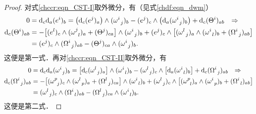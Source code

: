 \begin{proof}
    对式\eqref{chccr:eqn_CST-I}取外微分，有（见式\eqref{chdf:eqn_dwm}）
    \begin{align*}
        0 & = {\rm d}_c {\rm d}_a (e^i)_b =
        \bigl({\rm d}_c (e^j)_a\bigr) \wedge (\omega _{\hphantom{a} j}^i)_b
        -  (e^j)_c  \wedge \bigl({\rm d}_a(\omega _{\hphantom{a} j}^i)_b\bigr)
        +{\rm d}_c (\Theta ^{i})_{ab} \quad  { \Rightarrow} \\
        {\rm d}_c (\Theta ^{i})_{ab} &=  -
        \bigl [(e^l)_c \wedge (\omega _{\hphantom{a} l}^j)_a +(\Theta ^{j})_{ca} \bigr]
        \wedge (\omega _{\hphantom{a} j}^i)_b +  (e^j)_c  \wedge
        \bigl[ ( \omega _{\hphantom{a} j}^l )_a \wedge
        ( \omega _{\hphantom{a} l}^i )_b + (\Omega_{\hphantom{a} j} ^{i})_{ab} \bigr] \\
        &= (e^j)_c \wedge(\Omega_{\hphantom{a} j} ^{i})_{ab}
        -(\Theta ^{j})_{ca} \wedge (\omega _{\hphantom{a} j}^i)_b .
    \end{align*} 
    这便是第一式．再对\eqref{chccr:eqn_CST-II}取外微分，有
    \begin{align*}
        0 & = {\rm d}_c{\rm d}_a ( \omega _{\hphantom{a} j} ^i  )_b =
        \bigl[{\rm d}_c ( \omega _{\hphantom{a} j}^l )_a \bigr]
        \wedge ( \omega _{\hphantom{a} l}^i )_b
        -( \omega _{\hphantom{a} j}^l )_c   \wedge
        \bigl[ {\rm d}_a ( \omega _{\hphantom{a} l}^i )_b \bigr]
        + {\rm d}_c (\Omega_{\hphantom{a} j} ^{i})_{ab} \quad  { \Rightarrow} \\
        {\rm d}_c (\Omega_{\hphantom{a} j} ^{i})_{ab} &=
        -\bigl[( \omega _{\hphantom{a} j}^p )_c
        \wedge ( \omega _{\hphantom{a} p}^l )_a + (\Omega_{\hphantom{a} j} ^{l})_{ca} \bigr]
        \wedge ( \omega _{\hphantom{a} l}^i )_b +
        ( \omega _{\hphantom{a} j}^l )_c   \wedge
        \bigl[ ( \omega _{\hphantom{a} l}^p )_a
        \wedge ( \omega _{\hphantom{a} p}^i )_b + (\Omega_{\hphantom{a} l} ^{i})_{ab} \bigr] \\
        & = ( \omega _{\hphantom{a} j}^l )_c   \wedge (\Omega_{\hphantom{a} l} ^{i})_{ab}
        - (\Omega_{\hphantom{a} j} ^{l})_{ca}\wedge ( \omega _{\hphantom{a} l}^i )_b .
    \end{align*}   %
    这便是第二式．
\end{proof}

